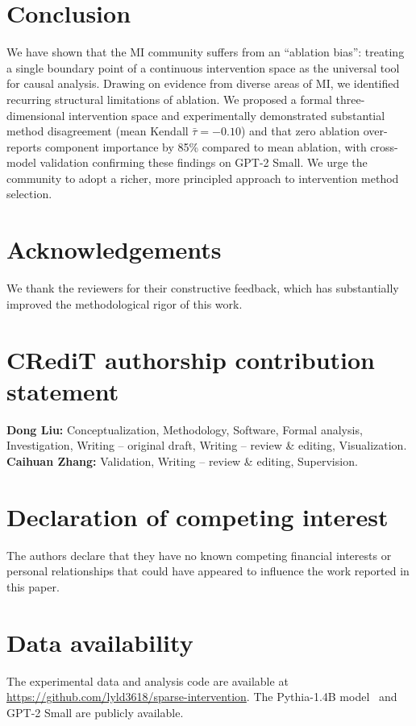 \documentclass[pdflatex,sn-mathphys-num]{sn-jnl}
\begin{document}
\section{Conclusion}
\label{sec:conclusion}

We have shown that the MI community suffers from an ``ablation bias'': treating a single boundary point of a continuous intervention space as the universal tool for causal analysis. Drawing on evidence from diverse areas of MI, we identified recurring structural limitations of ablation. We proposed a formal three-dimensional intervention space and experimentally demonstrated substantial method disagreement (mean Kendall $\bar\tau = -0.10$) and that zero ablation over-reports component importance by 85\% compared to mean ablation, with cross-model validation confirming these findings on GPT-2 Small. We urge the community to adopt a richer, more principled approach to intervention method selection.

\section*{Acknowledgements}

We thank the reviewers for their constructive feedback, which has substantially improved the methodological rigor of this work.

\section*{CRediT authorship contribution statement}
\textbf{Dong Liu:} Conceptualization, Methodology, Software, Formal analysis, Investigation, Writing -- original draft, Writing -- review \& editing, Visualization. \textbf{Caihuan Zhang:} Validation, Writing -- review \& editing, Supervision.

\section*{Declaration of competing interest}
The authors declare that they have no known competing financial interests or personal relationships that could have appeared to influence the work reported in this paper.

\section*{Data availability}
The experimental data and analysis code are available at \url{https://github.com/lyld3618/sparse-intervention}. The Pythia-1.4B model~\cite{Biderman2023} and GPT-2 Small are publicly available.


\end{document}
